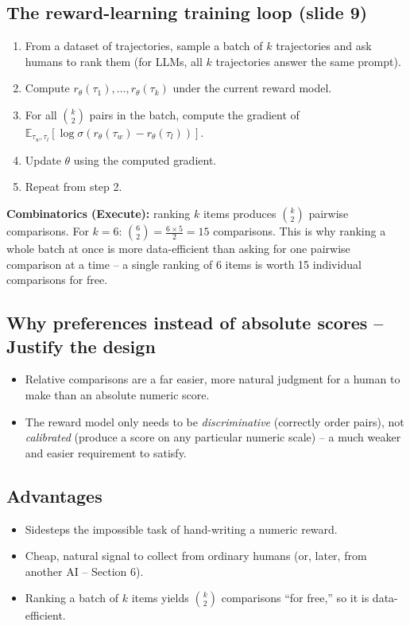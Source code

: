 \documentclass[11pt]{article}
\begin{document}
\subsection{The reward-learning training loop (slide 9)}
\begin{enumerate}
  \item From a dataset of trajectories, sample a batch of $k$ trajectories and
  ask humans to rank them (for LLMs, all $k$ trajectories answer the same
  prompt).
  \item Compute $r_\theta(\tau_1), \dots, r_\theta(\tau_k)$ under the current
  reward model.
  \item For all $\binom{k}{2}$ pairs in the batch, compute the gradient of
  $\mathbb{E}_{\tau_w,\tau_l}[\log \sigma(r_\theta(\tau_w)-r_\theta(\tau_l))]$.
  \item Update $\theta$ using the computed gradient.
  \item Repeat from step 2.
\end{enumerate}
\textbf{Combinatorics (Execute):} ranking $k$ items produces $\binom{k}{2}$
pairwise comparisons. For $k=6$: $\binom{6}{2} = \frac{6 \times 5}{2} = 15$
comparisons. This is why ranking a whole batch at once is more data-efficient
than asking for one pairwise comparison at a time -- a single ranking of 6 items
is worth 15 individual comparisons for free.

\subsection{Why preferences instead of absolute scores -- Justify the design}
\begin{itemize}
  \item Relative comparisons are a far easier, more natural judgment for a human
  to make than an absolute numeric score.
  \item The reward model only needs to be \emph{discriminative} (correctly order
  pairs), not \emph{calibrated} (produce a score on any particular numeric
  scale) -- a much weaker and easier requirement to satisfy.
\end{itemize}

\subsection{Advantages}
\begin{itemize}
  \item Sidesteps the impossible task of hand-writing a numeric reward.
  \item Cheap, natural signal to collect from ordinary humans (or, later, from
  another AI -- Section 6).
  \item Ranking a batch of $k$ items yields $\binom{k}{2}$ comparisons ``for
  free,'' so it is data-efficient.
\end{itemize}
\end{document}

